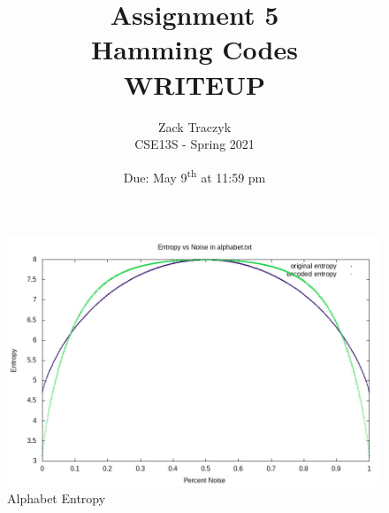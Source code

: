 \documentclass[12pt]{article}
\title{%
	\textbf{Assignment 5 \\ 
		Hamming Codes \\
\large WRITEUP} }
\author{Zack Traczyk \\ CSE13S - Spring 2021}
\date{Due: May 9\textsuperscript{th} at 11:59 pm}
\begin{document}
\maketitle


\begin{figure}[H]
	\caption{Alphabet Entropy}\label{alphabet_entropy}
	\includegraphics[width=6.5in]{alphabet.txt.entropy.jpg}
	\centering
\end{figure}
\end{document}
